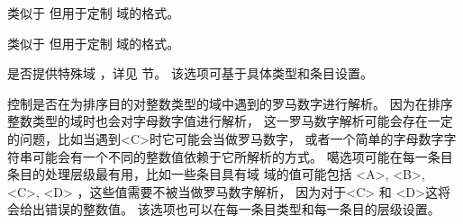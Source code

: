 \begin{optionlist}


类似于  但用于定制  域的格式。


类似于  但用于定制  域的格式。



是否提供特殊域 ，详见   节。
该选项可基于具体类型和条目设置。




控制是否在为排序目的对整数类型的域中遇到的罗马数字进行解析。
因为\biber 在排序整数类型的域时也会对字母数字值进行解析，
这一罗马数字解析可能会存在一定的问题，比如当遇到<C>时它可能会当做罗马数字，
或者一个简单的字母数字字符串可能会有一个不同的整数值依赖于它所解析的方式。
噶选项可能在每一条目条目的处理层级最有用，比如一些条目具有域
域的值可能包括 <A>, <B>, <C>, <D> ，这些值需要不被当做罗马数字解析，
因为对于<C> 和 <D>这将会给出错误的整数值。
该选项也可以在每一条目类型和每一条目的层级设置。





\end{optionlist}
